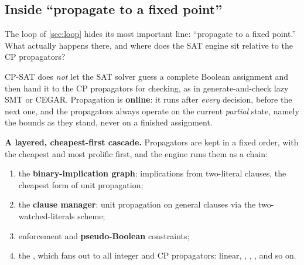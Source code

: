 \subsection{Inside ``propagate to a fixed point''}\label{sec:propstep}

The loop of \cref{sec:loop} hides its most important line:
``propagate to a fixed point.'' What actually happens there, and where does the
SAT engine sit relative to the CP propagators?

\begin{platypuswarning}
CP-SAT does \emph{not} let the SAT solver guess a complete Boolean assignment
and then hand it to the CP propagators for checking, as in generate-and-check
lazy SMT or CEGAR. Propagation is \textbf{online}: it runs after \emph{every}
decision, before the next one, and the propagators always operate on the current
\emph{partial} state, namely the bounds as they stand, never on a finished
assignment.
\end{platypuswarning}

\textbf{A layered, cheapest-first cascade.} Propagators are kept in a fixed
order, with the cheapest and most prolific first, and the engine runs them as a
chain:

\begin{enumerate}[leftmargin=1.6em,topsep=0.3em,itemsep=0.25em]
  \item the \textbf{binary-implication graph}: implications from two-literal
  clauses, the cheapest form of unit propagation;
  \item the \textbf{clause manager}: unit propagation on general clauses via the
  two-watched-literals scheme;
  \item enforcement and \textbf{pseudo-Boolean} constraints;
  \item the \textbf{}, which fans
  out to all integer and CP propagators: linear,
  ,
  ,
  , and so on.
\end{enumerate}

